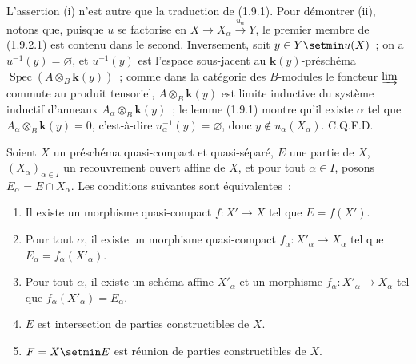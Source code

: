 L'assertion (i) n'est autre que la traduction de (1.9.1). Pour démontrer
(ii), notons que, puisque $u$ se factorise en
$X\to X_\alpha\xrightarrow{u_\alpha}Y$, le premier membre de (1.9.2.1) est
contenu dans le second. Inversement, soit $y\in Y\setmin u(X)$~; on a
$u^{-1}(y)=\varnothing$, et $u^{-1}(y)$ est l'espace sous-jacent au
$\boldsymbol{k}(y)$-préschéma $\operatorname{Spec}(A\otimes_B\boldsymbol{k}(y))$~; comme dans la
catégorie des $B$-modules le foncteur $\varinjlim$ commute au produit
tensoriel, $A\otimes_B\boldsymbol{k}(y)$ est limite inductive du système inductif d'anneaux
$A_\alpha\otimes_B\boldsymbol{k}(y)$~; le lemme (1.9.1) montre qu'il existe $\alpha$ tel
que $A_\alpha\otimes_B\boldsymbol{k}(y)=0$, c'est-à-dire
$u_\alpha^{-1}(y)=\varnothing$, donc $y\notin u_\alpha(X_\alpha)$. C.Q.F.D.

\begin{proposition}[1.9.3]
\label{IV.1.9.3-fr}
Soient $X$ un préschéma quasi-compact et quasi-séparé, $E$ une partie de $X$,
$(X_\alpha)_{\alpha\in I}$ un recouvrement ouvert affine de $X$, et pour
tout $\alpha\in I$, posons $E_\alpha=E\cap X_\alpha$. Les conditions
suivantes sont équivalentes~:
\begin{enumerate}
  \item[\textup{a)}] Il existe un morphisme quasi-compact $f:X'\to X$ tel que
  $E=f(X')$.
  \item[\textup{a$'$)}] Pour tout $\alpha$, il existe un morphisme quasi-compact
  $f_\alpha:X'_\alpha\to X_\alpha$ tel que
  $E_\alpha=f_\alpha(X'_\alpha)$.
  \item[\textup{a$''$)}] Pour tout $\alpha$, il existe un schéma affine $X'_\alpha$
  et un morphisme $f_\alpha:X'_\alpha\to X_\alpha$ tel que
  $f_\alpha(X'_\alpha)=E_\alpha$.
  \item[\textup{b)}] $E$ est intersection de parties constructibles de $X$.
  \item[\textup{b$'$)}] $F=X\setmin E$ est réunion de parties constructibles de $X$.
\end{enumerate}
\end{proposition}

